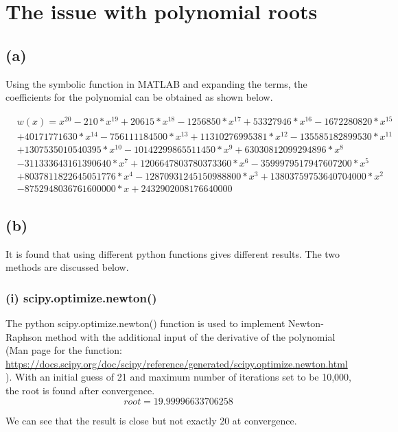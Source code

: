 \documentclass[a4paper, 12pt]{article}
\begin{document}
\section{The issue with polynomial roots}

\subsection*{(a)}

Using the symbolic function in MATLAB and expanding the terms, the coefficients for the polynomial can be obtained as shown below.

\[
\begin{split}
&w(x)=x^{20} - 210*x^{19} + 20615*x^{18} - 1256850*x^{17} + 53327946*x^{16} - 1672280820*x^{15}\\
& + 40171771630*x^{14} - 756111184500*x^{13} + 11310276995381*x^{12} - 135585182899530*x^{11}\\
& + 1307535010540395*x^{10} - 10142299865511450*x^{9} + 63030812099294896*x^{8} \\
& - 311333643161390640*x^{7} + 1206647803780373360*x^{6} - 3599979517947607200*x^{5} \\
& + 8037811822645051776*x^{4} - 12870931245150988800*x^{3} + 13803759753640704000*x^{2} \\
& - 8752948036761600000*x + 2432902008176640000
\end{split}
\]

\subsection*{(b)}
It is found that using different python functions gives different results. The two methods are discussed below.

\subsubsection*{(i) scipy.optimize.newton()}

The python scipy.optimize.newton() function is used to implement Newton-Raphson method with the additional input of the derivative of the polynomial (Man page for the function: \url{https://docs.scipy.org/doc/scipy/reference/generated/scipy.optimize.newton.html}). With an initial guess of 21 and maximum number of iterations set to be 10,000, the root is found after convergence.
\[root = 19.99996633706258\]

We can see that the result is close but not exactly 20 at convergence.
\end{document}
